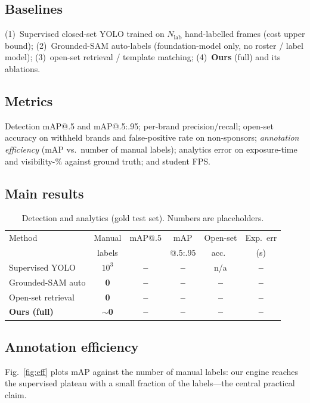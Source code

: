 \documentclass[conference]{IEEEtran}
\newcommand{\TODOnum}[1]{{\color{red}\textbf{#1}}}
\begin{document}
\subsection{Baselines}
(1)~Supervised closed-set YOLO trained on $N_{\text{lab}}$ hand-labelled frames
(cost upper bound); (2)~Grounded-SAM auto-labels (foundation-model only, no roster
/ label model); (3)~open-set retrieval / template matching; (4)~\textbf{Ours}
(full) and its ablations.

\subsection{Metrics}
Detection mAP@.5 and mAP@.5:.95; per-brand precision/recall; open-set accuracy on
withheld brands and false-positive rate on non-sponsors; \emph{annotation
efficiency} (mAP vs.\ number of manual labels); analytics error on exposure-time
and visibility-\% against ground truth; and student FPS.

\subsection{Main results}
\begin{table}[t]
\centering
\caption{Detection and analytics (gold test set). Numbers are placeholders.}
\label{tab:main}
\renewcommand{\arraystretch}{1.15}
\setlength{\tabcolsep}{3pt}
\begin{tabular}{lccccc}
\toprule
Method & Manual & mAP@.5 & mAP & Open-set & Exp.\ err \\
       & labels &        & @.5:.95 & acc.\   & (s) \\
\midrule
Supervised YOLO     & \TODOnum{$10^3$} & \TODOnum{--} & \TODOnum{--} & n/a          & \TODOnum{--} \\
Grounded-SAM auto   & \TODOnum{0}      & \TODOnum{--} & \TODOnum{--} & \TODOnum{--} & \TODOnum{--} \\
Open-set retrieval  & \TODOnum{0}      & \TODOnum{--} & \TODOnum{--} & \TODOnum{--} & \TODOnum{--} \\
\textbf{Ours (full)}& \TODOnum{$\sim$0}& \TODOnum{--} & \TODOnum{--} & \TODOnum{--} & \TODOnum{--} \\
\bottomrule
\end{tabular}
\end{table}

\subsection{Annotation efficiency}
Fig.~\ref{fig:eff} plots mAP against the number of manual labels: our engine
reaches the supervised plateau with a small fraction of the labels---the central
practical claim.
\end{document}
